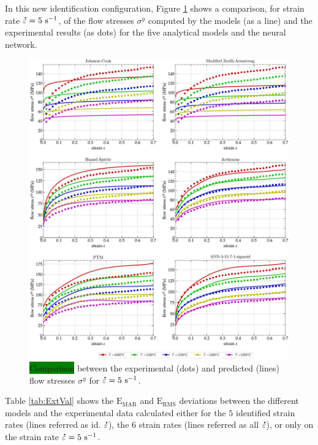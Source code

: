 \documentclass[metals,article,accept,pdftex,moreauthors]{Definitions/mdpi}
\DeclareRobustCommand{\mdot}[1]{\accentset{\mbox{\bfseries .}}{#1}}
\DeclareRobustCommand{\RMSE}{\text{E}_\text{RMS}}
\DeclareRobustCommand{\MARE}{\text{E}_\text{MAR}}
\DeclareRobustCommand{\ps}{\text{s}^{-1}}
\newcommand{\hlok}[1]{\colorbox{green}{#1}}
\begin{document}
In this new identification configuration, Figure \ref{fig:CompExt} shows a comparison, for strain rate $\mdot\varepsilon=5~\ps$, of the flow stresses $\sigma^y$ computed by the models (as a line) and the experimental results (as dots) for the five analytical models and the neural network.
\begin{figure}[H]

\includegraphics[width=0.98\columnwidth]
{Figures/CompExt}
\caption{\hlok{Comparison} %
 between the experimental (dots) and predicted (lines) flow stresses $\sigma^y$ for $\mdot\varepsilon=5~\ps$.}
\label{fig:CompExt}
\end{figure}
Table \ref{tab:ExtVal} shows the $\MARE$ and $\RMSE$ deviations between the different models and the experimental data calculated either for the $5$ identified strain rates (lines referred as id. $\mdot\varepsilon$), the $6$ strain rates (lines referred as all $\mdot\varepsilon$), or only on the strain rate $\mdot\varepsilon=5~\ps$.
\end{document}
